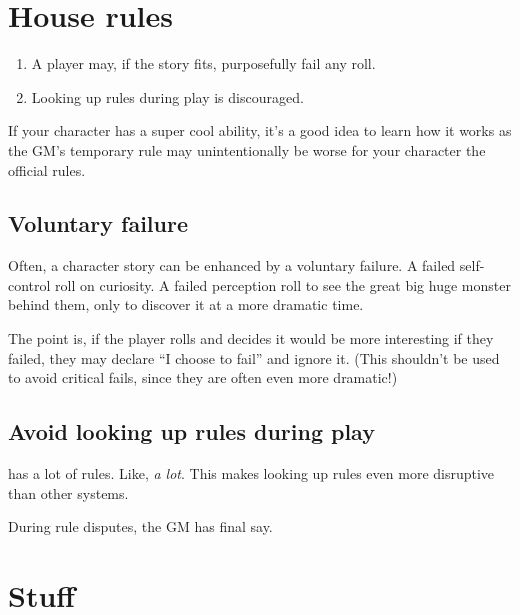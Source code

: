 \section{House rules}
\label{sec:house-rules}

\begin{enumerate}
\item A player may, if the story fits, purposefully fail any roll.
\item Looking up rules during play is discouraged.
\end{enumerate}

If your character has a super cool ability, it's a good idea to learn how it
works as the GM's temporary rule may unintentionally be worse for your character
the official rules.

\subsection{Voluntary failure}
\label{sec:voluntary-failure}

Often, a character story can be enhanced by a voluntary failure. A failed
self-control roll on curiosity. A failed perception roll to see the great big
huge monster behind them, only to discover it at a more dramatic time.

The point is, if the player rolls and decides it would be more interesting if
they failed, they may declare ``I choose to fail'' and ignore it. (This
shouldn't be used to avoid critical fails, since they are often even more
dramatic!)


\subsection{Avoid looking up rules during play}
\label{sec:no-rules}

\gurps has a lot of rules. Like, \emph{a lot}. This makes looking up rules even
more disruptive than other systems.

During rule disputes, the GM has final say.


\section{Stuff}
\label{sec:stuff}

